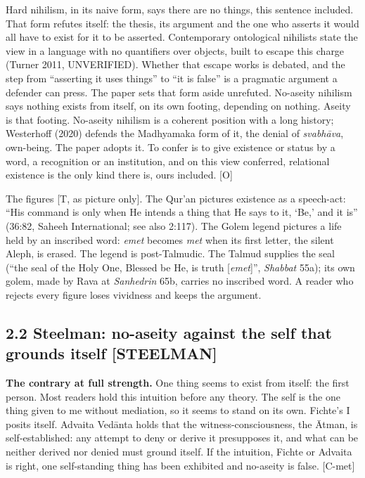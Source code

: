 \documentclass[11pt]{article}
\newcommand{\register}[1]{{\ttfamily\small #1}}
\begin{document}
Hard nihilism, in its naive form, says there are no things, this sentence included. That form refutes itself: the thesis, its argument and the one who asserts it would all have to exist for it to be asserted. Contemporary ontological nihilists state the view in a language with no quantifiers over objects, built to escape this charge (Turner 2011, UNVERIFIED). Whether that escape works is debated, and the step from ``asserting it uses things'' to ``it is false'' is a pragmatic argument a defender can press. The paper sets that form aside unrefuted. No-aseity nihilism says nothing exists from itself, on its own footing, depending on nothing. Aseity is that footing. No-aseity nihilism is a coherent position with a long history; Westerhoff (2020) defends the Madhyamaka form of it, the denial of \emph{svabhāva}, own-being. The paper adopts it. To confer is to give existence or status by a word, a recognition or an institution, and on this view conferred, relational existence is the only kind there is, ours included. [O]

The figures [T, as picture only]. The Qur'an pictures existence as a speech-act: ``His command is only when He intends a thing that He says to it, `Be,' and it is'' (36:82, Saheeh International; see also 2:117). The Golem legend pictures a life held by an inscribed word: \emph{emet} becomes \emph{met} when its first letter, the silent Aleph, is erased. The legend is post-Talmudic. The Talmud supplies the seal (``the seal of the Holy One, Blessed be He, is truth [\emph{emet}]'', \emph{Shabbat} 55a); its own golem, made by Rava at \emph{Sanhedrin} 65b, carries no inscribed word. A reader who rejects every figure loses vividness and keeps the argument.

\subsection*{2.2 Steelman: no-aseity against the self that grounds itself \register{[STEELMAN]}}

\textbf{The contrary at full strength.} One thing seems to exist from itself: the first person. Most readers hold this intuition before any theory. The self is the one thing given to me without mediation, so it seems to stand on its own. Fichte's I posits itself. Advaita Vedānta holds that the witness-consciousness, the Ātman, is self-established: any attempt to deny or derive it presupposes it, and what can be neither derived nor denied must ground itself. If the intuition, Fichte or Advaita is right, one self-standing thing has been exhibited and no-aseity is false. [C-met]
\end{document}
